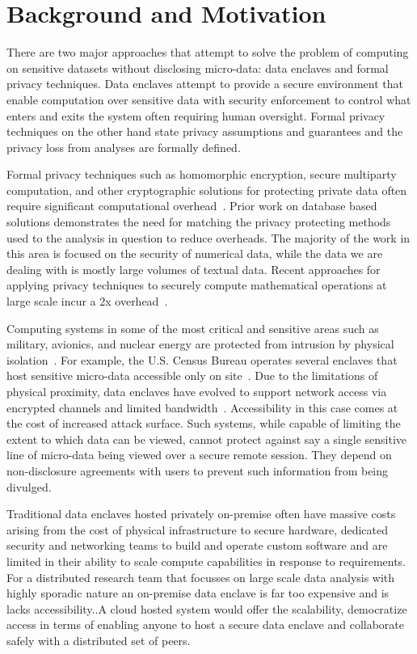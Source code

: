 \section{Background and Motivation} \label{sec:background}

There are two major approaches that attempt to solve the problem of computing on sensitive
datasets without disclosing micro-data: data enclaves and formal privacy techniques. Data enclaves attempt to
provide a secure environment that enable computation over sensitive data with security enforcement
to control what enters and exits the system often requiring human oversight. Formal privacy
techniques on the other hand state privacy assumptions and guarantees and the privacy loss
from analyses are formally defined.

Formal privacy techniques such as homomorphic encryption, secure multiparty computation, and
other cryptographic solutions for protecting private data often require significant computational
overhead~\cite{naehrig2011can}. Prior work on database based solutions \cite{popa2011cryptdb}
demonstrates the need for matching the privacy protecting methods used to the analysis in question
to reduce overheads. The majority of the work in this area is focused on the security of
numerical data, while the data we are dealing with is mostly large volumes of textual data.
Recent approaches for applying privacy techniques to securely compute
mathematical operations at large scale incur a 2x overhead~\cite{kepner2014computing}.

Computing systems in some of the most critical and sensitive areas such as military, avionics,
and nuclear energy are protected from intrusion by physical isolation~\cite{byres2013air, ross2013security}.
For example, the U.S. Census Bureau operates several enclaves that host sensitive micro-data accessible
only on site~\cite{rdc_uscensus}. Due to the limitations of physical proximity, data enclaves
have evolved to support network access via encrypted channels and limited bandwidth~\cite{lane2008using, grossman2016toward}.
Accessibility in this case comes at the cost of increased attack surface. Such systems, while
capable of limiting the extent to which data can be viewed, cannot protect against say a single
sensitive line of micro-data being viewed over a secure remote session. They depend on non-disclosure
agreements with users to prevent such information from being divulged.

Traditional data enclaves hosted privately on-premise often have massive costs arising
from the cost of physical infrastructure to secure hardware, dedicated security and networking
teams to build and operate custom software and are limited in their ability to scale
compute capabilities in response to requirements. For a distributed research team that
focusses on large scale data analysis with highly sporadic nature an on-premise data enclave
is far too expensive and is lacks accessibility..A cloud hosted system would offer the scalability,
democratize access in terms of enabling anyone to host a secure data enclave and collaborate safely with a
distributed set of peers.

